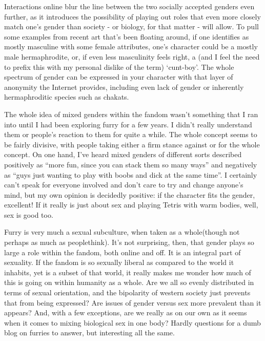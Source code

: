 Interactions online blur the line between the two socially accepted genders even further, as it introduces the possibility of playing out roles that even more closely match one's gender than society - or biology, for that matter - will allow. To pull some examples from recent art that's been floating around, if one identifies as mostly masculine with some female attributes, one's character could be a mostly male hermaphrodite, or, if even less masculinity feels right, a (and I feel the need to prefix this with my personal dislike of the term) `cunt-boy'. The whole spectrum of gender can be expressed in your character with that layer of anonymity the Internet provides, including even lack of gender or inherently hermaphroditic species such as chakats.

The whole idea of mixed genders within the fandom wasn't something that I ran into until I had been exploring furry for a few years. I didn't really understand them or people's reaction to them for quite a while. The whole concept seems to be fairly divisive, with people taking either a firm stance against or for the whole concept. On one hand, I've heard mixed genders of different sorts described positively as ``more fun, since you can stack them so many ways'' and negatively as ``guys just wanting to play with boobs and dick at the same time''. I certainly can't speak for everyone involved and don't care to try and change anyone's mind, but my own opinion is decidedly positive: if the character fits the gender, excellent! If it really is just about sex and playing Tetris with warm bodies, well, sex is good too.

Furry is very much a sexual subculture, when taken as a whole(though not perhaps as much as peoplethink). It's not surprising, then, that gender plays so large a role within the fandom, both online and off. It is an integral part of sexuality. If the fandom is so sexually liberal as compared to the world it inhabits, yet is a subset of that world, it really makes me wonder how much of this is going on within humanity as a whole. Are we all so evenly distributed in terms of sexual orientation, and the bipolarity of western society just prevents that from being expressed? Are issues of gender versus sex more prevalent than it appears? And, with a few exceptions, are we really as on our own as it seems when it comes to mixing biological sex in one body? Hardly questions for a dumb blog on furries to answer, but interesting all the same.
